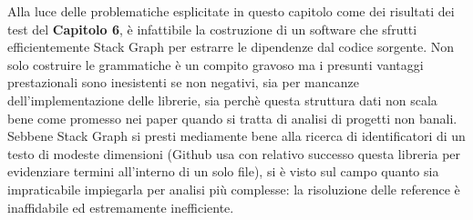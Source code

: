 Alla luce delle problematiche esplicitate in questo capitolo come dei risultati dei test del \textbf{Capitolo 6}, \`e infattibile la costruzione di un software che sfrutti efficientemente Stack Graph per estrarre le dipendenze dal codice sorgente. Non solo costruire le grammatiche \`e un compito gravoso ma i presunti vantaggi prestazionali sono inesistenti se non negativi, sia per mancanze dell'implementazione delle librerie, sia perch\`e questa struttura dati non scala bene come promesso nei paper quando si tratta di analisi di progetti non banali. Sebbene Stack Graph si presti mediamente bene alla ricerca di identificatori di un testo di modeste dimensioni (Github usa con relativo successo questa libreria per evidenziare termini all'interno di un solo file), si \`e visto sul campo quanto sia impraticabile impiegarla per analisi pi\`u complesse: la risoluzione delle reference \`e inaffidabile ed estremamente inefficiente.

